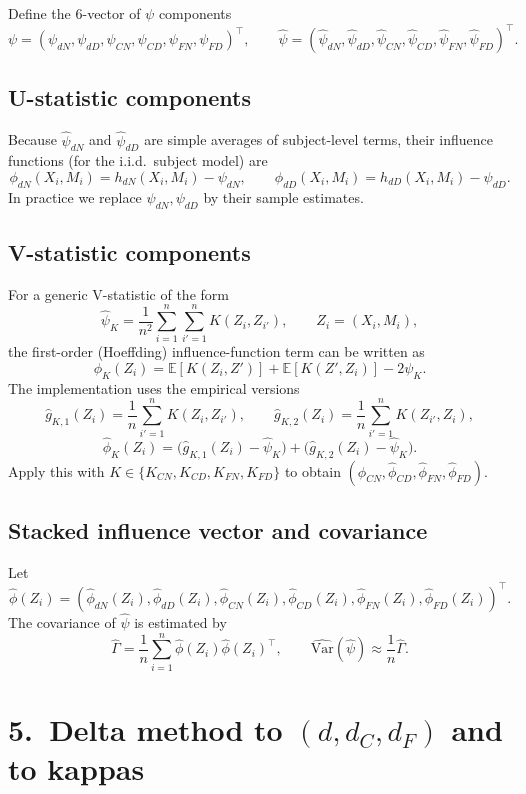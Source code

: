 \documentclass[11pt]{article}
\begin{document}
Define the 6-vector of $\psi$ components
\[
  \psi =
  (\psi_{dN},\psi_{dD},\psi_{CN},\psi_{CD},\psi_{FN},\psi_{FD})^\top,
  \qquad
  \hat\psi =
  (\hat\psi_{dN},\hat\psi_{dD},\hat\psi_{CN},\hat\psi_{CD},\hat\psi_{FN},\hat\psi_{FD})^\top.
\]

\subsection*{U-statistic components}

Because $\hat\psi_{dN}$ and $\hat\psi_{dD}$ are simple averages of subject-level
terms, their influence functions (for the i.i.d.\ subject model) are
\[
  \phi_{dN}(X_i,M_i)=h_{dN}(X_i,M_i)-\psi_{dN},
  \qquad
  \phi_{dD}(X_i,M_i)=h_{dD}(X_i,M_i)-\psi_{dD}.
\]
In practice we replace $\psi_{dN},\psi_{dD}$ by their sample estimates.

\subsection*{V-statistic components}

For a generic V-statistic of the form
\[
  \hat\psi_K=\frac{1}{n^2}\sum_{i=1}^n\sum_{i'=1}^n K(Z_i,Z_{i'}),
  \qquad Z_i=(X_i,M_i),
\]
the first-order (Hoeffding) influence-function term can be written as
\[
  \phi_K(Z_i)
  = \mathbb{E}[K(Z_i,Z')] + \mathbb{E}[K(Z',Z_i)] - 2\psi_K.
\]
The implementation uses the empirical versions
\[
  \hat g_{K,1}(Z_i)=\frac1n\sum_{i'=1}^n K(Z_i,Z_{i'}),
  \qquad
  \hat g_{K,2}(Z_i)=\frac1n\sum_{i'=1}^n K(Z_{i'},Z_i),
\]
\[
  \hat\phi_K(Z_i)=\big(\hat g_{K,1}(Z_i)-\hat\psi_K\big)+\big(\hat g_{K,2}(Z_i)-\hat\psi_K\big).
\]
Apply this with $K\in\{K_{CN},K_{CD},K_{FN},K_{FD}\}$ to obtain
$(\hat\phi_{CN},\hat\phi_{CD},\hat\phi_{FN},\hat\phi_{FD})$.

\subsection*{Stacked influence vector and covariance}

Let
\[
  \hat\phi(Z_i) =
  (\hat\phi_{dN}(Z_i),\hat\phi_{dD}(Z_i),\hat\phi_{CN}(Z_i),\hat\phi_{CD}(Z_i),\hat\phi_{FN}(Z_i),\hat\phi_{FD}(Z_i))^\top.
\]
The covariance of $\hat\psi$ is estimated by
\[
  \widehat{\Gamma}=\frac1n\sum_{i=1}^n \hat\phi(Z_i)\hat\phi(Z_i)^\top,
  \qquad
  \widehat{\mathrm{Var}}(\hat\psi) \approx \frac{1}{n}\widehat{\Gamma}.
\]

\section*{5.\ Delta method to $(d,d_C,d_F)$ and to kappas}
\end{document}
